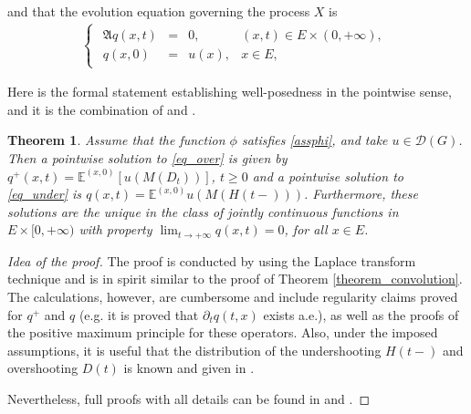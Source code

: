 \documentclass[reqno]{amsart}
\newtheorem{theorem}{Theorem}[section] %
\theoremstyle{remark}
\numberwithin{equation}{section} %
\newcommand{\DD}{\mathcal{D}}
\newcommand{\1}{\mathds{1}}
\begin{document}
	and that the evolution equation governing the process $X$ is
	\begin{align}
		\begin{cases}\label{eq_under} 
			\begin{array}{rcll}
				\mathfrak{A}q(x,t) &=& 0,  &(x,t)\in E\times (0,+\infty),\\
				q(x,0) &=& u(x), &x\in E,
			\end{array}
		\end{cases} 
	\end{align}
	
	Here is the formal statement establishing well-posedness in the pointwise sense, and it is the combination of \cite[Theorem 5.2]{ascione2024} and \cite[Theorem 4.2]{biocic2025}. 
	\begin{theorem}
		Assume that the function $\phi$  satisfies \ref{assphi}, and take $u\in \DD(G)$. Then a pointwise solution to \eqref{eq_over}
		is given by $q^+(x,t)=\mathds{E}^{(x,0)}[u(M({D_t}))]$, $t\ge0$ and a pointwise solution to \eqref{eq_under} is $q(x,t) = \mathds{E}^{(x,0)}u(M(H(t-)))$. 
		Furthermore, these solutions are the unique in the class of jointly continuous functions in $E\times [0,+\infty)$ with property $\lim_{t\to +\infty} q(x,t)=0$, for all $x\in E$.
	\end{theorem}
	\begin{proof}[Idea of the proof]
		The proof is conducted by using the Laplace transform technique and is in spirit similar to the proof of Theorem \ref{theorem_convolution}. The calculations, however, are cumbersome and include regularity claims proved for $q^+$ and $q$ (e.g. it is proved that $\partial_t q(t,x)$ exists a.e.), as well as the proofs of the positive maximum principle for these operators. Also, under the imposed assumptions, it is useful that the distribution of the undershooting $H(t-)$ and overshooting $D(t)$ is known and given in \cite{bertoin1996}.
		
		Nevertheless, full proofs with all details can be found in \cite{ascione2024} and \cite{biocic2025}.
	\end{proof}
	
\end{document}
